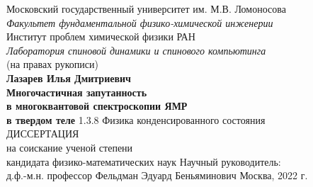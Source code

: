 \begin{titlepage}
\begin{center}
  {\large Московский государственный университет им. М.В. Ломоносова} \\
  {\it Факультет фундаментальной физико-химической инженерии} \\
  \vspace{1cm}
  {\large Институт проблем химической физики РАН} \\
  {\it Лаборатория спиновой динамики и спинового компьютинга} \\
  \vfill
  (на правах рукописи) \\
  \vfill
  {\Large \bf Лазарев Илья Дмитриевич} \\
  \vspace{1cm}
  {\Large \bf
      Многочастичная запутанность \\
      в многоквантовой спектроскопии ЯМР \\
      \vspace{2mm}
      в твердом теле
  }
 \vfill
  1.3.8 Физика конденсированного состояния \\
 \vspace{1cm}
 ДИССЕРТАЦИЯ \\
 на соискание ученой степени \\
 кандидата физико-математических наук
 \vfill
 {\large
   Научный руководитель:\\
   д.ф.-м.н. профессор Фельдман Эдуард Беньяминович
 }
 \vfill
 Москва, 2022 г.
\end{center}
\end{titlepage}
